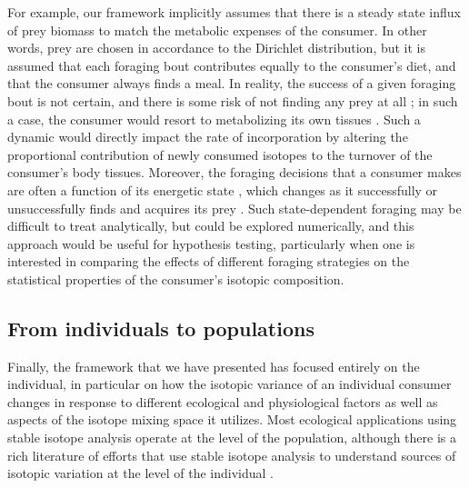 \documentclass{frontiersSCNS}
\begin{document}
For example, our framework implicitly assumes that there is a steady state influx of prey biomass to match the metabolic expenses of the consumer.
In other words, prey are chosen in accordance to the Dirichlet distribution, but it is assumed that each foraging bout contributes equally to the consumer's diet, and that the consumer always finds a meal.
In reality, the success of a given foraging bout is not certain, and there is some risk of not finding any prey at all \citep{Creel:2008p838}; in such a case, the consumer would resort to metabolizing its own tissues \citep{Doucett:1999bz,VanderZanden:2001p2449}.
Such a dynamic would directly impact the rate of incorporation by altering the proportional contribution of newly consumed isotopes to the turnover of the consumer's body tissues.
Moreover, the foraging decisions that a consumer makes are often a function of its energetic state \citep{Barnett:2007er,Yeakel:2013hi}, which changes as it successfully or unsuccessfully finds and acquires its prey \citep{Mangel:1986um}.
Such state-dependent foraging may be difficult to treat analytically, but could be explored numerically, and this approach would be useful for hypothesis testing, particularly when one is interested in comparing the effects of different foraging strategies on the statistical properties of the consumer's isotopic composition.




\subsection*{From individuals to populations}
Finally, the framework that we have presented has focused entirely on the individual, in particular on how the isotopic variance of an individual consumer changes in response to different ecological and physiological factors as well as aspects of the isotope mixing space it utilizes.
Most ecological applications using stable isotope analysis operate at the level of the population, although there is a rich literature of efforts that use stable isotope analysis to understand sources of isotopic variation at the level of the individual \citep{Koch:1995vj,Matthews:2004hw,Sponheimer:2006fj,Post:2008ki,Newsome:2009tn,Yeakel:2009hz,Newsome:WhhVfocb,Hopkins:2015ip}.
\end{document}

